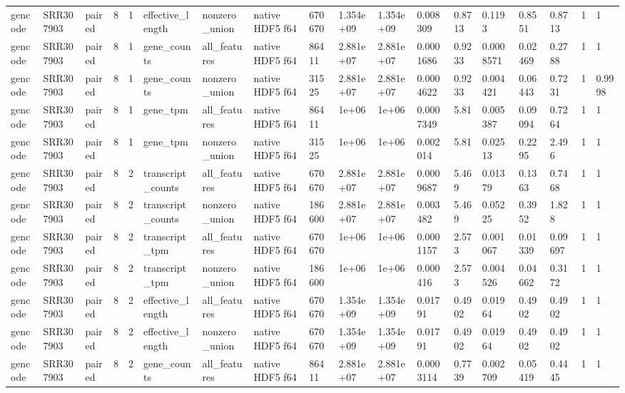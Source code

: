 \begin{tabular}{llllllllllllllllll}
gencode & SRR307903 & paired & 8 & 1 & effective\_length & nonzero\_union & native HDF5 f64 & 670670 & 1.354e+09 & 1.354e+09 & 0.008309 & 0.8713 & 0.1193 & 0.8551 & 0.8713 & 1 & 1 \\
gencode & SRR307903 & paired & 8 & 1 & gene\_counts & all\_features & native HDF5 f64 & 86411 & 2.881e+07 & 2.881e+07 & 0.0001686 & 0.9233 & 0.0008571 & 0.02469 & 0.2788 & 1 & 1 \\
gencode & SRR307903 & paired & 8 & 1 & gene\_counts & nonzero\_union & native HDF5 f64 & 31525 & 2.881e+07 & 2.881e+07 & 0.0004622 & 0.9233 & 0.004421 & 0.06443 & 0.7231 & 1 & 0.9998 \\
gencode & SRR307903 & paired & 8 & 1 & gene\_tpm & all\_features & native HDF5 f64 & 86411 & 1e+06 & 1e+06 & 0.0007349 & 5.81 & 0.005387 & 0.09094 & 0.7264 & 1 & 1 \\
gencode & SRR307903 & paired & 8 & 1 & gene\_tpm & nonzero\_union & native HDF5 f64 & 31525 & 1e+06 & 1e+06 & 0.002014 & 5.81 & 0.02513 & 0.2295 & 2.496 & 1 & 1 \\
gencode & SRR307903 & paired & 8 & 2 & transcript\_counts & all\_features & native HDF5 f64 & 670670 & 2.881e+07 & 2.881e+07 & 0.0009687 & 5.469 & 0.01379 & 0.1363 & 0.7468 & 1 & 1 \\
gencode & SRR307903 & paired & 8 & 2 & transcript\_counts & nonzero\_union & native HDF5 f64 & 186600 & 2.881e+07 & 2.881e+07 & 0.003482 & 5.469 & 0.05225 & 0.3952 & 1.828 & 1 & 1 \\
gencode & SRR307903 & paired & 8 & 2 & transcript\_tpm & all\_features & native HDF5 f64 & 670670 & 1e+06 & 1e+06 & 0.0001157 & 2.573 & 0.001067 & 0.01339 & 0.09697 & 1 & 1 \\
gencode & SRR307903 & paired & 8 & 2 & transcript\_tpm & nonzero\_union & native HDF5 f64 & 186600 & 1e+06 & 1e+06 & 0.000416 & 2.573 & 0.004526 & 0.04662 & 0.3172 & 1 & 1 \\
gencode & SRR307903 & paired & 8 & 2 & effective\_length & all\_features & native HDF5 f64 & 670670 & 1.354e+09 & 1.354e+09 & 0.01791 & 0.4902 & 0.01964 & 0.4902 & 0.4902 & 1 & 1 \\
gencode & SRR307903 & paired & 8 & 2 & effective\_length & nonzero\_union & native HDF5 f64 & 670670 & 1.354e+09 & 1.354e+09 & 0.01791 & 0.4902 & 0.01964 & 0.4902 & 0.4902 & 1 & 1 \\
gencode & SRR307903 & paired & 8 & 2 & gene\_counts & all\_features & native HDF5 f64 & 86411 & 2.881e+07 & 2.881e+07 & 0.0003114 & 0.7739 & 0.002709 & 0.05419 & 0.4445 & 1 & 1 \\

\end{tabular}
